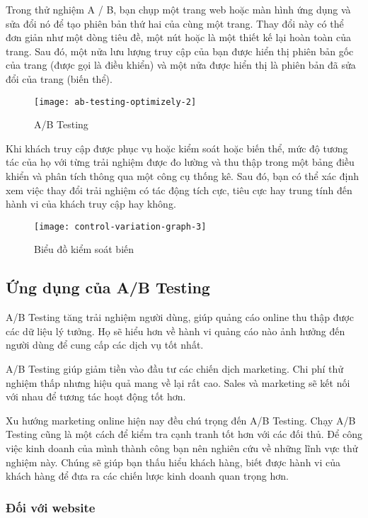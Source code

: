 Trong thử nghiệm A / B, bạn chụp một trang web hoặc màn hình ứng dụng và sửa đổi nó để tạo phiên bản thứ hai của cùng một trang. Thay đổi này có thể đơn giản như một dòng tiêu đề, một nút hoặc là một thiết kế lại hoàn toàn của trang. Sau đó, một nửa lưu lượng truy cập của bạn được hiển thị phiên bản gốc của trang (được gọi là điều khiển) và một nửa được hiển thị là phiên bản đã sửa đổi của trang (biến thể).

\begin{figure}[ht]
	\centering
	\texttt{[image: ab-testing-optimizely-2]}
	\caption{A/B Testing}
\end{figure}

Khi khách truy cập được phục vụ hoặc kiểm soát hoặc biến thể, mức độ tương tác của họ với từng trải nghiệm được đo lường và thu thập trong một bảng điều khiển và phân tích thông qua một công cụ thống kê. Sau đó, bạn có thể xác định xem việc thay đổi trải nghiệm có tác động tích cực, tiêu cực hay trung tính đến hành vi của khách truy cập hay không.

\begin{figure}[ht]
	\centering
	\texttt{[image: control-variation-graph-3]}
	\caption{Biểu đồ kiểm soát biến}
\end{figure}

\subsection{Ứng dụng của A/B Testing}

A/B Testing tăng trải nghiệm người dùng, giúp quảng cáo online thu thập được các dữ liệu lý tưởng. Họ sẽ hiểu hơn về hành vi quảng cáo nào ảnh hưởng đến người dùng để cung cấp các dịch vụ tốt nhất.

A/B Testing giúp giảm tiền vào đầu tư các chiến dịch marketing. Chi phí thử nghiệm thấp nhưng hiệu quả mang về lại rất cao. Sales và marketing sẽ kết nối với nhau để tương tác hoạt động tốt hơn.

Xu hướng marketing online hiện nay đều chú trọng đến A/B Testing. Chạy A/B Testing cũng là một cách để kiểm tra cạnh tranh tốt hơn với các đối thủ. Để công việc kinh doanh của mình thành công bạn nên nghiên cứu về những lĩnh vực thử nghiệm này. Chúng sẽ giúp bạn thấu hiểu khách hàng, biết được hành vi của khách hàng để đưa ra các chiến lược kinh doanh quan trọng hơn.

\subsubsection{Đối với website}

